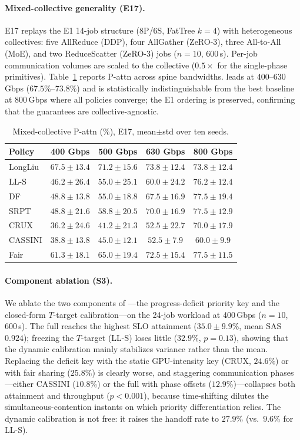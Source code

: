 \paragraph{Mixed-collective generality (E17).}
E17 replays the E1 14-job structure (8P/6S, FatTree $k{=}4$) with heterogeneous collectives: five AllReduce (DDP), four AllGather (ZeRO-3), three All-to-All (MoE), and two ReduceScatter (ZeRO-3) jobs ($n{=}10$, 600\,s). Per-job communication volumes are scaled to the collective ($0.5\times$ for the single-phase primitives). Table~\ref{tab:e17} reports P-attn across spine bandwidths. \Name leads at 400--630\,Gbps ($67.5\%$--$73.8\%$) and is statistically indistinguishable from the best baseline at 800\,Gbps where all policies converge; the E1 ordering is preserved, confirming that the guarantees are collective-agnostic.

\begin{table}[h]
\centering
\caption{Mixed-collective P-attn (\%), E17, mean$\pm$std over ten seeds.}
\label{tab:e17}
\footnotesize
\setlength{\tabcolsep}{4pt}
\begin{tabular}{@{}lcccc@{}}
\toprule
\textbf{Policy} & 400 Gbps & 500 Gbps & 630 Gbps & 800 Gbps \\
\midrule
LongLiu & $67.5\pm13.4$ & $71.2\pm15.6$ & $73.8\pm12.4$ & $73.8\pm12.4$ \\
LL-S & $46.2\pm26.4$ & $55.0\pm25.1$ & $60.0\pm24.2$ & $76.2\pm12.4$ \\
DF & $48.8\pm13.8$ & $55.0\pm18.8$ & $67.5\pm16.9$ & $77.5\pm19.4$ \\
SRPT & $48.8\pm21.6$ & $58.8\pm20.5$ & $70.0\pm16.9$ & $77.5\pm12.9$ \\
CRUX & $36.2\pm24.6$ & $41.2\pm21.3$ & $52.5\pm22.7$ & $70.0\pm17.9$ \\
CASSINI & $38.8\pm13.8$ & $45.0\pm12.1$ & $52.5\pm7.9$ & $60.0\pm9.9$ \\
Fair & $61.3\pm18.1$ & $65.0\pm19.4$ & $72.5\pm15.4$ & $77.5\pm11.5$ \\
\bottomrule
\end{tabular}
\end{table}

\paragraph{Component ablation (S3).}
We ablate the two components of \Name---the progress-deficit priority key and the closed-form $T$-target calibration---on the 24-job workload at 400\,Gbps ($n{=}10$, 600\,s). The full \Name{} reaches the highest SLO attainment ($35.0\pm9.9\%$, mean SAS $0.924$); freezing the $T$-target (LL-S) loses little ($32.9\%$, $p{=}0.13$), showing that the dynamic calibration mainly stabilizes variance rather than the mean. Replacing the deficit key with the static GPU-intensity key (CRUX, $24.6\%$) or with fair sharing ($25.8\%$) is clearly worse, and staggering communication phases---either CASSINI ($10.8\%$) or the full \Name{} with phase offsets ($12.9\%$)---collapses both attainment and throughput ($p<0.001$), because time-shifting dilutes the simultaneous-contention instants on which priority differentiation relies. The dynamic calibration is not free: it raises the handoff rate to $27.9\%$ (vs.\ $9.6\%$ for LL-S).


